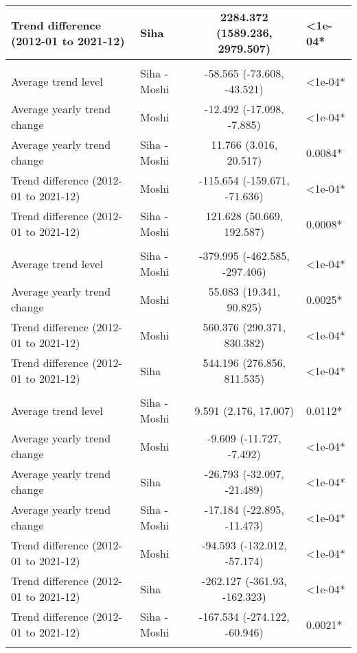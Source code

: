 \begin{longtable}{l|lcl}
Trend difference (2012-01 to 2021-12) & Siha & 2284.372 (1589.236, 2979.507) & <1e-04* \\ 
\midrule\addlinespace[2.5pt]
\multicolumn{4}{l}{Trauma} \\[2.5pt] 
\midrule\addlinespace[2.5pt]
Average trend level & Siha - Moshi & -58.565 (-73.608, -43.521) & <1e-04* \\ 
Average yearly trend change & Moshi & -12.492 (-17.098, -7.885) & <1e-04* \\ 
Average yearly trend change & Siha - Moshi & 11.766 (3.016, 20.517) & 0.0084* \\ 
Trend difference (2012-01 to 2021-12) & Moshi & -115.654 (-159.671, -71.636) & <1e-04* \\ 
Trend difference (2012-01 to 2021-12) & Siha - Moshi & 121.628 (50.669, 192.587) & 0.0008* \\ 
\midrule\addlinespace[2.5pt]
\multicolumn{4}{l}{Urinary Infections} \\[2.5pt] 
\midrule\addlinespace[2.5pt]
Average trend level & Siha - Moshi & -379.995 (-462.585, -297.406) & <1e-04* \\ 
Average yearly trend change & Moshi & 55.083 (19.341, 90.825) & 0.0025* \\ 
Trend difference (2012-01 to 2021-12) & Moshi & 560.376 (290.371, 830.382) & <1e-04* \\ 
Trend difference (2012-01 to 2021-12) & Siha & 544.196 (276.856, 811.535) & <1e-04* \\ 
\midrule\addlinespace[2.5pt]
\multicolumn{4}{l}{Vector-borne Infections} \\[2.5pt] 
\midrule\addlinespace[2.5pt]
Average trend level & Siha - Moshi & 9.591 (2.176, 17.007) & 0.0112* \\ 
Average yearly trend change & Moshi & -9.609 (-11.727, -7.492) & <1e-04* \\ 
Average yearly trend change & Siha & -26.793 (-32.097, -21.489) & <1e-04* \\ 
Average yearly trend change & Siha - Moshi & -17.184 (-22.895, -11.473) & <1e-04* \\ 
Trend difference (2012-01 to 2021-12) & Moshi & -94.593 (-132.012, -57.174) & <1e-04* \\ 
Trend difference (2012-01 to 2021-12) & Siha & -262.127 (-361.93, -162.323) & <1e-04* \\ 
Trend difference (2012-01 to 2021-12) & Siha - Moshi & -167.534 (-274.122, -60.946) & 0.0021* \\ 
\midrule\addlinespace[2.5pt]
\multicolumn{4}{l}{Malnutrition} \\[2.5pt] 

\end{longtable}

